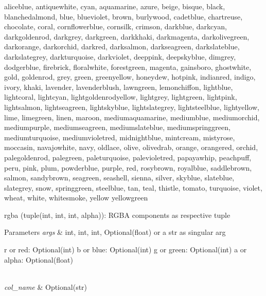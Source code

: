 aliceblue, antiquewhite, cyan, aquamarine, azure, beige, bisque, black, blanchedalmond, blue, blueviolet, brown, burlywood, cadetblue, chartreuse, chocolate, coral, cornflowerblue, cornsilk, crimson, darkblue, darkcyan, darkgoldenrod, darkgrey, darkgreen, darkkhaki, darkmagenta, darkolivegreen, darkorange, darkorchid, darkred, darksalmon, darkseagreen, darkslateblue, darkslategrey, darkturquoise, darkviolet, deeppink, deepskyblue, dimgrey, dodgerblue, firebrick, floralwhite, forestgreen, magenta, gainsboro, ghostwhite, gold, goldenrod, grey, green, greenyellow, honeydew, hotpink, indianred, indigo, ivory, khaki, lavender, lavenderblush, lawngreen, lemonchiffon, lightblue, lightcoral, lightcyan, lightgoldenrodyellow, lightgrey, lightgreen, lightpink, lightsalmon, lightseagreen, lightskyblue, lightslategrey, lightsteelblue, lightyellow, lime, limegreen, linen, maroon, mediumaquamarine, mediumblue, mediumorchid, mediumpurple, mediumseagreen, mediumslateblue, mediumspringgreen, mediumturquoise, mediumvioletred, midnightblue, mintcream, mistyrose, moccasin, navajowhite, navy, oldlace, olive, olivedrab, orange, orangered, orchid, palegoldenrod, palegreen, paleturquoise, palevioletred, papayawhip, peachpuff, peru, pink, plum, powderblue, purple, red, rosybrown, royalblue, saddlebrown, salmon, sandybrown, seagreen, seashell, sienna, silver, skyblue, slateblue, slategrey, snow, springgreen, steelblue, tan, teal, thistle, tomato, turquoise, violet, wheat, white, whitesmoke, yellow yellowgreen

\begin{DoxyVerb}    rgba (tuple(int, int, int, alpha)): RGBA components as respective tuple
\end{DoxyVerb}



\begin{DoxyParams}{Parameters}
{\em args} & int, int, int, Optional(float) or a str as singular arg \begin{DoxyVerb}       r or red: Optional(int)
       b or blue: Optional(int)
       g or green: Optional(int)
       a or alpha: Optional(float)
\end{DoxyVerb}
 \\
\hline
{\em col\+\_\+name} & Optional(str)\\
\hline
\end{DoxyParams}

